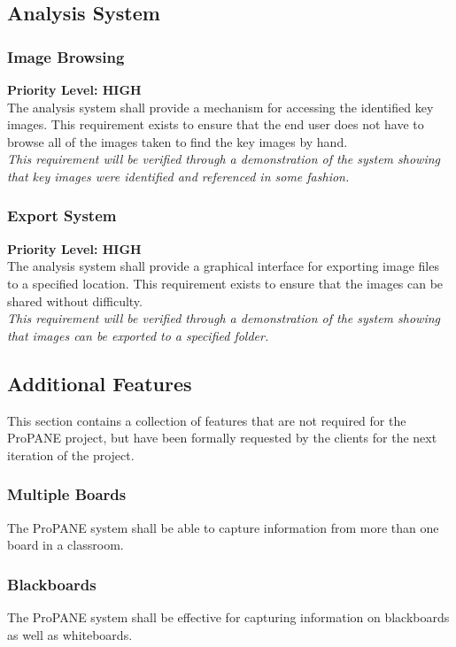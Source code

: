 \documentclass[]{article}
\begin{document}
				
		\subsection{Analysis System}
			
			\subsubsection{Image Browsing}
				\textbf{Priority Level: HIGH}\\
				The analysis system shall provide a mechanism for accessing the identified key images. This requirement exists to ensure that the end user does not have to browse all of the images taken to find the key images by hand.\\
				\emph{This requirement will be verified through a demonstration of the system showing that key images were identified and referenced in some fashion.}
				
			\subsubsection{Export System}
				\textbf{Priority Level: HIGH}\\
				The analysis system shall provide a graphical interface for exporting image files to a specified location. This requirement exists to ensure that the images can be shared without difficulty.\\
				\emph{This requirement will be verified through a demonstration of the system showing that images can be exported to a specified folder.}
				
		\subsection{Additional Features}
				This section contains a collection of features that are not required for the ProPANE project, but have been formally requested by the clients for the next iteration of the project.
			
			\subsubsection{Multiple Boards}
				The ProPANE system shall be able to capture information from more than one board in a classroom.
			
			\subsubsection{Blackboards}
				The ProPANE system shall be effective for capturing information on blackboards as well as whiteboards. 
				
\end{document}
